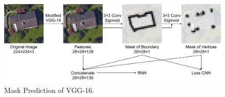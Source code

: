 \begin{figure}[!h]
	\centering
	\includegraphics[width=\fig\textwidth]{3-03.pdf}
    \caption{Mask Prediction of VGG-16.}
    \label{fig:vgg16mask}
\end{figure}